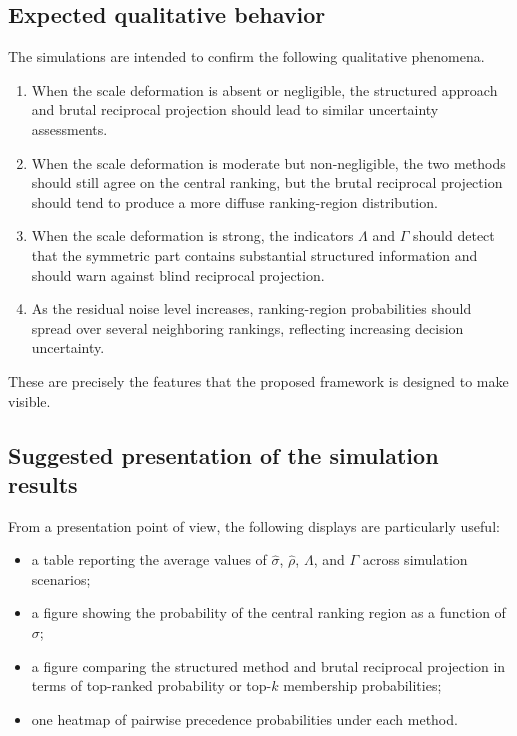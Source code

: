 \documentclass[11pt]{amsart}
\theoremstyle{definition}
\theoremstyle{plain}
\numberwithin{equation}{section}
\begin{document}
\subsection{Expected qualitative behavior}

The simulations are intended to confirm the following qualitative phenomena.

\begin{enumerate}[label=\textup{(\arabic*)}]
\item When the scale deformation is absent or negligible, the structured approach and brutal reciprocal projection should lead to similar uncertainty assessments.
\item When the scale deformation is moderate but non-negligible, the two methods should still agree on the central ranking, but the brutal reciprocal projection should tend to produce a more diffuse ranking-region distribution.
\item When the scale deformation is strong, the indicators $\Lambda$ and $\Gamma$ should detect that the symmetric part contains substantial structured information and should warn against blind reciprocal projection.
\item As the residual noise level increases, ranking-region probabilities should spread over several neighboring rankings, reflecting increasing decision uncertainty.
\end{enumerate}

These are precisely the features that the proposed framework is designed to make visible.

\subsection{Suggested presentation of the simulation results}

From a presentation point of view, the following displays are particularly useful:
\begin{itemize}
\item a table reporting the average values of $\widehat\sigma$, $\widehat\rho$, $\Lambda$, and $\Gamma$ across simulation scenarios;
\item a figure showing the probability of the central ranking region as a function of $\sigma$;
\item a figure comparing the structured method and brutal reciprocal projection in terms of top-ranked probability or top-$k$ membership probabilities;
\item one heatmap of pairwise precedence probabilities under each method.
\end{itemize}
\end{document}
